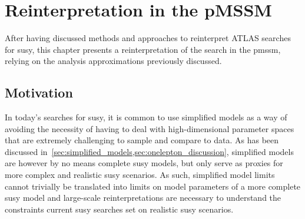 


\chapter{Reinterpretation in the pMSSM}\label{ch:pmssm}

\graphicspath{{chapter-pmssm/Figs/Vector/}{chapter-pmssm/Figs/}}

After having discussed methods and approaches to reinterpret ATLAS searches for \gls{susy}, this chapter presents a reinterpretation of the \onelepton search in the \gls{pmssm}, relying on the analysis approximations previously discussed.

\section{Motivation}

In today's searches for \gls{susy}, it is common to use simplified models as a way of avoiding the necessity of having to deal with high-dimensional parameter spaces that are extremely challenging to sample and compare to data.
As has been discussed in~\cref{sec:simplified_models,sec:onelepton_discussion}, simplified models are however by no means complete \gls{susy} models, but only serve as proxies for more complex and realistic \gls{susy} scenarios. As such, simplified model limits cannot trivially be translated into limits on model parameters of a more complete \gls{susy} model and large-scale reinterpretations are necessary to understand the constraints current \gls{susy} searches set on realistic \gls{susy} scenarios. 

